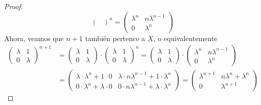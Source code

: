 \begin{proof}
\[\begin{pmatrix}
            \end{pmatrix} ^ {n}
            =
            \begin{pmatrix}
                \lambda^{n} & n\lambda^{n - 1} \\
                0 & \lambda^{n}
            \end{pmatrix}
        \]
        Ahora, veamos que \(n + 1\) también pertence a \(X\), o equivalentemente
        \[
            \begin{aligned}
                \begin{pmatrix}
                    \lambda & 1 \\
                    0 & \lambda
                \end{pmatrix} ^ {n + 1}
                &=
                \begin{pmatrix}
                    \lambda & 1 \\
                    0 & \lambda
                \end{pmatrix}
                \cdot
                \begin{pmatrix}
                    \lambda & 1 \\
                    0 & \lambda
                \end{pmatrix} ^ {n}
                =
                \begin{pmatrix}
                    \lambda & 1 \\
                    0 & \lambda
                \end{pmatrix}
                \cdot
                \begin{pmatrix}
                    \lambda^{n} & n\lambda^{n - 1} \\
                    0 & \lambda^{n}
                \end{pmatrix}
                \\
                &=
                \begin{pmatrix}
                    \lambda \cdot \lambda^{n} + 1 \cdot 0 & \lambda \cdot n\lambda^{n - 1} + 1 \cdot \lambda^{n} \\
                    0 \cdot \lambda^{n} + \lambda \cdot 0 & 0 \cdot n\lambda^{n - 1} + \lambda \cdot \lambda^{n}
                \end{pmatrix}
                =
                \begin{pmatrix}
                    \lambda^{n + 1} & n\lambda^{n} + \lambda^{n} \\
                    0 & \lambda^{n + 1}

\end{pmatrix}
\end{aligned}\]
\end{proof}
